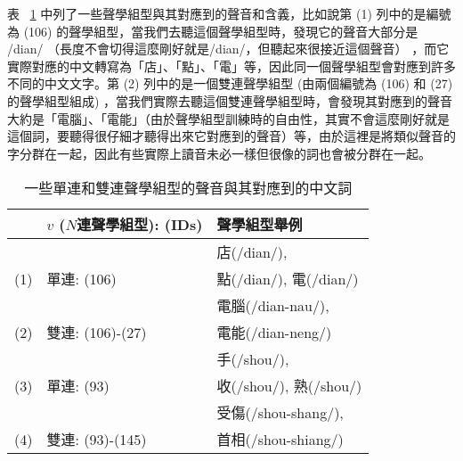 表 ~\ref{table:chap4_pattern_example} 中列了一些聲學組型與其對應到的聲音和含義，比如說第 (1) 列中的是編號為 (106) 的聲學組型，當我們去聽這個聲學組型時，發現它的聲音大部分是 /dian/ （長度不會切得這麼剛好就是/dian/，但聽起來很接近這個聲音） ，而它實際對應的中文轉寫為「店」、「點」、「電」等，因此同一個聲學組型會對應到許多不同的中文文字。第 (2) 列中的是一個雙連聲學組型 (由兩個編號為 (106) 和 (27) 的聲學組型組成)
，當我們實際去聽這個雙連聲學組型時，會發現其對應到的聲音大約是「電腦」、「電能」（由於聲學組型訓練時的自由性，其實不會這麼剛好就是這個詞，要聽得很仔細才聽得出來它對應到的聲音）等，由於這裡是將類似聲音的字分群在一起，因此有些實際上讀音未必一樣但很像的詞也會被分群在一起。

\begin{table}[htbp]
\centering
\begin{tabular}{|lll|}
\hline
 & $v$ ($N$連聲學組型): (IDs) & 聲學組型舉例 \\
\hline
 & &  店(/dian/), \\
(1) & 單連: (106) & 點(/dian/), 電(/dian/) \\
\hline 
 &  & 電腦(/dian-nau/), \\
(2) & 雙連: (106)-(27) & 電能(/dian-neng/) \\
\hline
 & & 手(/shou/), \\
(3) & 單連: (93) &  收(/shou/), 熟(/shou/)\\ 
\hline
 & & 受傷(/shou-shang/), \\
(4) & 雙連: (93)-(145) &  首相(/shou-shiang/) \\
\hline

\end{tabular}
\caption{一些單連和雙連聲學組型的聲音與其對應到的中文詞}
\label{table:chap4_pattern_example}
\end{table}

